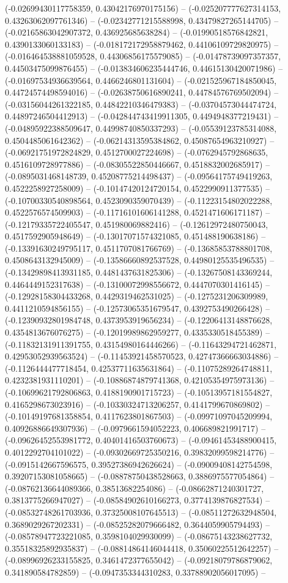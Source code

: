(-0.02699430117758359, 0.43042176970175156) -- (-0.025207777627314153, 0.43263062097761346) -- (-0.02342771215588998, 0.43479827265144705) -- (-0.02165863042907372, 0.436925685638284) -- (-0.01990518576842821, 0.4390133060133183) -- (-0.018172172958879462, 0.44106109729820975) -- (-0.016464538881059528, 0.44306856175579085) -- (-0.01478739097357357, 0.44503475099876455) -- (-0.013834606235444746, 0.44615130420071986) -- (-0.01697534936639564, 0.4466246801131604) -- (-0.021525967184850045, 0.44724574498594016) -- (-0.02638750616890241, 0.44784576769502094) -- (-0.03156044261322185, 0.44842210346479383) -- (-0.03704573044474724, 0.44897246504412913) -- (-0.042844743419911305, 0.4494948377219431) -- (-0.04895922388509647, 0.44998740850337293) -- (-0.05539123785314088, 0.4504485061642362) -- (-0.06214313595384862, 0.45087654963210927) -- (-0.06921751972824829, 0.4512700027224698) -- (-0.0762945792868635, 0.4516109728977886) -- (-0.08305522850446667, 0.4518832002685917) -- (-0.0895031468148739, 0.45208775214498437) -- (-0.09564175749419263, 0.4522258927258009) -- (-0.10147420124720154, 0.4522990911377535) -- (-0.10700330540898564, 0.4523090359070439) -- (-0.11223154802022288, 0.4522576574509903) -- (-0.11716101606141288, 0.4521471606171187) -- (-0.12179335722405547, 0.451980069882416) -- (-0.12612972480750043, 0.4517592905948649) -- (-0.13017071574321085, 0.451488190638186) -- (-0.13391630249795117, 0.4511707081766769) -- (-0.13685853788801708, 0.4508643132945009) -- (-0.13586660892537528, 0.44980125535496535) -- (-0.13429898413931185, 0.4481437631825306) -- (-0.13267508143369244, 0.4464449152317638) -- (-0.13100072998556672, 0.4447070301416145) -- (-0.12928158304433268, 0.4429319462531025) -- (-0.1275231206309989, 0.4411210594856155) -- (-0.12573065351679547, 0.4392753490266428) -- (-0.12390932801984748, 0.4373953919656234) -- (-0.12206413148876628, 0.4354813676076275) -- (-0.12019989862959277, 0.4335330518455389) -- (-0.11832131911391755, 0.43154980164446266) -- (-0.11643294721462871, 0.42953052939563524) -- (-0.11453921458570523, 0.42747366663034886) -- (-0.1126444477718454, 0.42537711635631864) -- (-0.11075289264748811, 0.4232381931110201) -- (-0.10886874879741368, 0.42105354975973136) -- (-0.10699621792806863, 0.4188190901715723) -- (-0.10513957181554827, 0.4165298673023916) -- (-0.10330324713206257, 0.4141799670869802) -- (-0.10149197681358854, 0.4117623801867503) -- (-0.09971097045209994, 0.40926886649307936) -- (-0.0979661594052223, 0.406689821991717) -- (-0.09626452553981772, 0.40401416503760673) -- (-0.09461453488900415, 0.4012292704101022) -- (-0.09302669725350216, 0.39832099598214776) -- (-0.0915142667596575, 0.39527386942626624) -- (-0.09009408142754598, 0.39207153081058665) -- (-0.08878750438528663, 0.3886975577054864) -- (-0.08762136644089366, 0.38513682254086) -- (-0.08662871240301727, 0.3813775266947027) -- (-0.08584902610166273, 0.3774139876827534) -- (-0.08532748261703936, 0.37325008107645513) -- (-0.08511272632948504, 0.3689029267202331) -- (-0.08525282079666482, 0.3644059905794493) -- (-0.08578947723221085, 0.3598104029930099) -- (-0.08675143238627732, 0.35518325892935837) -- (-0.08814864146044418, 0.35060225512642257) -- (-0.08996926233155825, 0.3461472377655042) -- (-0.09218079786879062, 0.341890584782859) -- (-0.0947353344310283, 0.33788902056017095) -- 